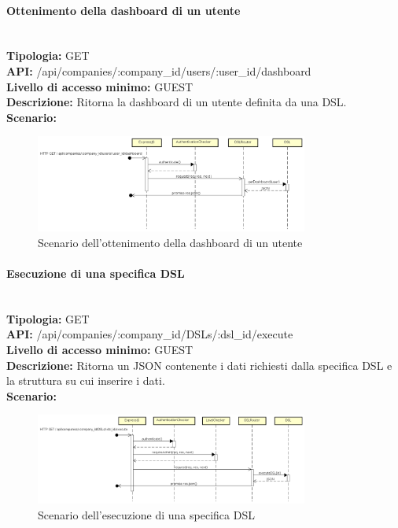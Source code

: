 \newpage
\paragraph{Ottenimento della dashboard di un utente}\mbox{}\\
\textbf{Tipologia:} GET \\
\textbf{API:} /api/companies/:company\_id/users/:user\_id/dashboard \\
\textbf{Livello di accesso minimo:} GUEST \\
\textbf{Descrizione:} Ritorna la dashboard di un utente definita da una DSL. \\
\textbf{Scenario:}  
\begin{figure}[H]
\centering
\includegraphics[width=0.8\textwidth]{res/sections/backend/sequence/(GET)dashboard.png}
\caption{Scenario dell'ottenimento della dashboard di un utente}
\end{figure}

\newpage
\paragraph{Esecuzione di una specifica DSL}\mbox{}\\
\textbf{Tipologia:} GET \\
\textbf{API:} /api/companies/:company\_id/DSLs/:dsl\_id/execute \\
\textbf{Livello di accesso minimo:} GUEST \\
\textbf{Descrizione:} Ritorna un JSON contenente i dati richiesti dalla specifica DSL e la struttura su cui inserire i dati. \\
\textbf{Scenario:} 
\begin{figure}[H]
\centering
\includegraphics[width=0.8\textwidth]{res/sections/backend/sequence/(GET)dslByIDex.png}
\caption{Scenario dell'esecuzione di una specifica DSL}
\end{figure}

